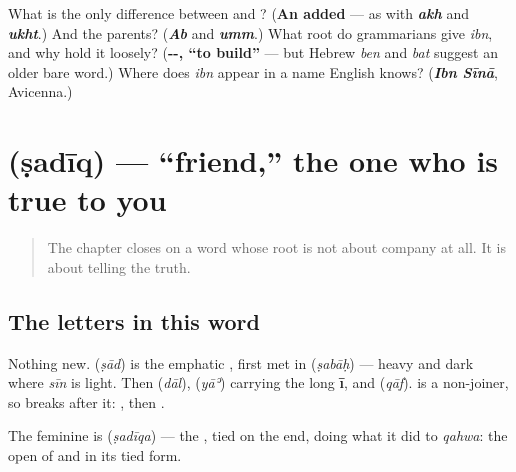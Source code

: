 \begin{tcolorbox}[breakable,colback=teal!4,colframe=teal!35!black,title={Before you move on}]
What is the only difference between \textbf{} and \textbf{}? (\textbf{An added } — as with \emph{\textbf{akh}} and \emph{\textbf{ukht}}.) And the parents? (\emph{\textbf{Ab}} and \emph{\textbf{umm}}.) What root do grammarians give \emph{ibn}, and why hold it loosely? (\textbf{--, \textquotedblleft{}to build\textquotedblright{}} — but Hebrew \emph{ben} and \emph{bat} suggest an older bare word.) Where does \emph{ibn} appear in a name English knows? (\emph{\textbf{Ibn Sīnā}}, Avicenna.)
\end{tcolorbox}
\section[\texorpdfstring{\ar{صديق} (ṣadīq)}{صديق (ṣadīq)}]{ (ṣadīq) — \textquotedblleft{}friend,\textquotedblright{} the one who is true to you}

\label{lesson:AR-C35-sadiq}



\begin{quote}
The chapter closes on a word whose root is not about company at all. It is about telling the truth.
\end{quote}

\subsection*{The letters in this word}
Nothing new. \textbf{} (\emph{ṣād}) is the emphatic \textbf{}, first met in \textbf{} (\emph{ṣabāḥ}) — heavy and dark where \emph{sīn} is light. Then \textbf{} (\emph{dāl}), \textbf{} (\emph{yāʾ}) carrying the long \textbf{ī}, and \textbf{} (\emph{qāf}). \textbf{} is a non-joiner, so \textbf{} breaks after it: \textbf{}, then \textbf{}.

The feminine is \textbf{} (\emph{ṣadīqa}) — the \textbf{}, tied on the end, doing what it did to \emph{qahwa}: the open \textbf{} of \textbf{} and \textbf{} in its tied form.

